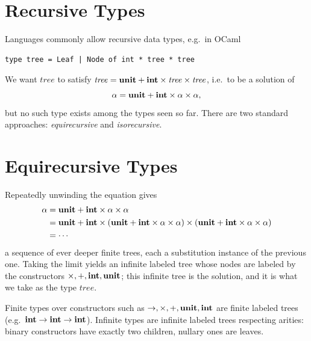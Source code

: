 \section{Recursive Types}

Languages commonly allow recursive data types, e.g.\ in OCaml
\begin{verbatim}
type tree = Leaf | Node of int * tree * tree
\end{verbatim}
We want $\mathit{tree}$ to satisfy
$\mathit{tree} = \mathbf{unit} + \mathbf{int} \times \mathit{tree} \times \mathit{tree}$,
i.e.\ to be a solution of
\[
\alpha = \mathbf{unit} + \mathbf{int} \times \alpha \times \alpha,
\]
but no such type exists among the types seen so far. There are two standard
approaches: \emph{equirecursive} and \emph{isorecursive}.

\section{Equirecursive Types}

Repeatedly unwinding the equation gives
\begin{align*}
\alpha &= \mathbf{unit} + \mathbf{int} \times \alpha \times \alpha \\
       &= \mathbf{unit} + \mathbf{int} \times (\mathbf{unit} + \mathbf{int} \times \alpha \times \alpha)
          \times (\mathbf{unit} + \mathbf{int} \times \alpha \times \alpha) \\
       &= \cdots
\end{align*}
a sequence of ever deeper finite trees, each a substitution instance of the
previous one. Taking the limit yields an infinite labeled tree whose nodes are
labeled by the constructors $\times, +, \mathbf{int}, \mathbf{unit}$; this infinite tree
is the solution, and it is what we take as the type $\mathit{tree}$.

Finite types over constructors such as $\to, \times, +, \mathbf{unit}, \mathbf{int}$ are
finite labeled trees (e.g.\ $\mathbf{int} \to \mathbf{int} \to \mathbf{int}$). Infinite types
are infinite labeled trees respecting arities: binary constructors have exactly
two children, nullary ones are leaves.

\begin{center}
\end{center}

